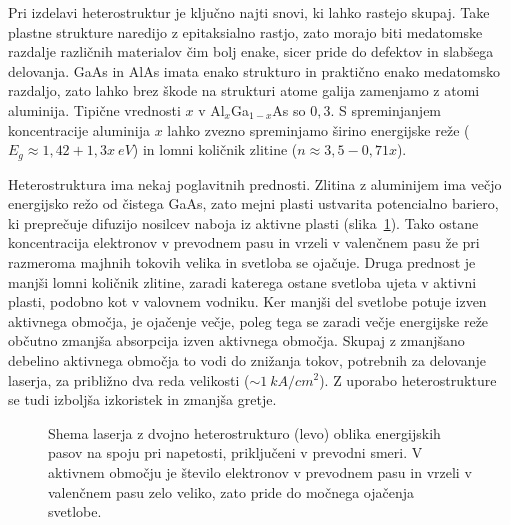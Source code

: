 \begin{remark}
Pri izdelavi heterostruktur je ključno najti snovi, ki lahko rastejo skupaj.
Take plastne strukture naredijo z epitaksialno rastjo, zato morajo biti medatomske
razdalje različnih materialov čim bolj enake, sicer pride do defektov in slabšega delovanja. 
GaAs in AlAs imata enako strukturo in praktično enako medatomsko razdaljo, zato 
lahko brez škode na strukturi atome galija zamenjamo z atomi aluminija. Tipične 
vrednosti $x$ v Al$_x$Ga$_{1-x}$As so $0,3$. S spreminjanjem koncentracije aluminija $x$ lahko 
zvezno spreminjamo širino energijske reže ($E_g \approx 1,42 + 1,3x~\si{eV}$) in lomni količnik 
zlitine ($n \approx 3,5-0,71x$).
\end{remark}

Heterostruktura ima nekaj poglavitnih prednosti. Zlitina z aluminijem ima večjo 
energijsko režo od čistega GaAs, zato mejni plasti ustvarita potencialno bariero, 
ki preprečuje difuzijo nosilcev naboja iz aktivne plasti (slika~\ref{fig:hetero}). Tako ostane koncentracija 
elektronov v prevodnem pasu in vrzeli v valenčnem pasu že pri razmeroma majhnih tokovih
velika in svetloba se ojačuje. Druga prednost je manjši lomni količnik zlitine, 
zaradi katerega ostane svetloba ujeta v aktivni plasti, podobno kot v valovnem 
vodniku. Ker manjši del svetlobe potuje izven aktivnega območja, je ojačenje večje,
poleg tega se zaradi večje energijske reže občutno zmanjša absorpcija izven aktivnega območja.
Skupaj z zmanjšano debelino aktivnega območja to vodi do znižanja tokov, 
potrebnih za delovanje laserja, za približno dva reda velikosti ($\sim 1~\si{kA}/\si{cm}^2$). 
Z uporabo heterostrukture se tudi izboljša izkoristek in zmanjša gretje.  
\begin{figure}[h]
\centering
\def\svgwidth{145truemm} 

\caption{Shema laserja z dvojno heterostrukturo (levo) oblika energijskih pasov 
na spoju pri napetosti, priključeni v prevodni smeri. V aktivnem območju
je število elektronov v prevodnem pasu in vrzeli v valenčnem pasu zelo veliko, zato pride do 
močnega ojačenja svetlobe.
}
\label{fig:hetero}
\end{figure}

